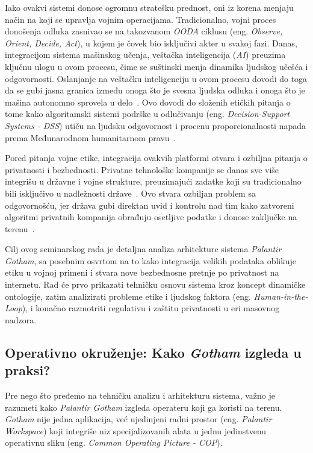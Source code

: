 ﻿\documentclass[12pt]{article}
\begin{document}
Iako ovakvi sistemi donose ogromnu stratešku prednost, oni iz korena menjaju način na koji se upravlja vojnim operacijama.
Tradicionalno, vojni proces donošenja odluka zasnivao se na takozvanom \textit{OODA} ciklusu (eng. \textit{Observe, Orient, Decide, Act}), u kojem je čovek bio isključivi akter u svakoj fazi.
Danas, integracijom sistema mašinskog učenja, veštačka inteligencija (\textit{AI}) preuzima ključnu ulogu u ovom procesu, čime se suštinski menja dinamika ljudskog učešća i odgovornosti.
Oslanjanje na veštačku inteligenciju u ovom procesu dovodi do toga da se gubi jasna granica između onoga što je svesna ljudska odluka i onoga što je mašina autonomno sprovela u delo~\cite{woodcock2024human}.
Ovo dovodi do složenih etičkih pitanja o tome kako algoritamski sistemi podrške u odlučivanju (eng. \textit{Decision-Support Systems - DSS}) utiču na ljudsku odgovornost i procenu proporcionalnosti napada prema Međunarodnom humanitarnom pravu~\cite{woodcock2024human, icrc2024bias}.

Pored pitanja vojne etike, integracija ovakvih platformi otvara i ozbiljna pitanja o privatnosti i bezbednosti.
Privatne tehnološke kompanije se danas sve više integrišu u državne i vojne strukture, preuzimajući zadatke koji su tradicionalno bili isključivo u nadležnosti države~\cite{carnegie2024private}.
Ovo stvara ozbiljan problem sa odgovornošću, jer država gubi direktan uvid i kontrolu nad tim kako zatvoreni algoritmi privatnih kompanija obrađuju osetljive podatke i donose zaključke na terenu~\cite{ulbricht2024palantir}.

Cilj ovog seminarskog rada je detaljna analiza arhitekture sistema \textit{Palantir Gotham}, sa posebnim osvrtom na to kako integracija velikih podataka oblikuje etiku u vojnoj primeni i stvara nove bezbednosne pretnje po privatnost na internetu.
Rad će prvo prikazati tehničku osnovu sistema kroz koncept dinamičke ontologije, zatim analizirati probleme etike i ljudskog faktora (eng. \textit{Human-in-the-Loop}), i konačno razmotriti regulativu i zaštitu privatnosti u eri masovnog nadzora.

\newpage

\subsection{Operativno okruženje: Kako \textit{Gotham} izgleda u praksi?}

Pre nego što pređemo na tehničku analizu i arhitekturu sistema, važno je razumeti kako \textit{Palantir Gotham} izgleda operateru koji ga koristi na terenu.
\textit{Gotham} nije jedna aplikacija, već ujedinjeni radni prostor (eng. \textit{Palantir Workspace}) koji integriše niz specijalizovanih alata u jednu jedinstvenu operativnu sliku (eng. \textit{Common Operating Picture - COP}).
\end{document}
